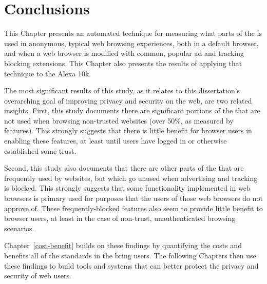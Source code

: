 \section{Conclusions}
\label{measurement:conclusions}

This Chapter presents an automated technique for measuring what parts of the
\WAPI is used in anonymous, typical web browsing experiences, both in
a default browser, and when a web browser is modified with common, popular
ad and tracking blocking extensions.  This Chapter also presents the results
of applying that technique to the Alexa 10k.

The most significant results of this study, as it relates to this
dissertation's overarching goal of improving privacy and security on the web,
are two related insights.  First, this study documents there are significant
portions of the \WAPI that are not used when browsing non-trusted websites
(over 50\%, as measured by \WAPI features).  This strongly suggests that there
is little benefit for browser users in enabling these features, at least until
users have logged in or otherwise established some trust.

Second, this study also documents that there are other parts of the \WAPI
that are frequently used by websites, but which go unused when advertising
and tracking is blocked.  This strongly suggests that some \WAPI functionality
implemented in web browsers is primary used for purposes that the users of those
web browsers do not approve of.  These frequently-blocked features also seem
to provide little benefit to browser users, at least in the case of non-trust,
unauthenticated browsing scenarios.

Chapter~\ref{cost-benefit} builds on these findings by quantifying the costs
and benefits all of the standards in the \WAPI bring users.  The following
Chapters then use these findings to build tools and systems that can
better protect the privacy and security of web users.
